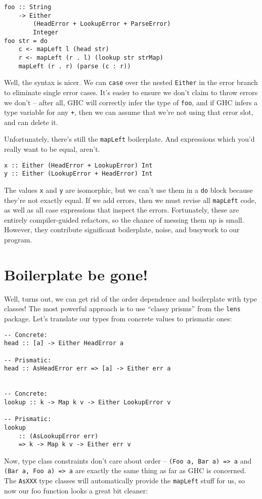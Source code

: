\begin{verbatim}
foo :: String
    -> Either
        (HeadError + LookupError + ParseError)
        Integer
foo str = do
    c <- mapLeft l (head str)
    r <- mapLeft (r . l) (lookup str strMap)
    mapLeft (r . r) (parse (c : r))
\end{verbatim}
Well, the syntax is nicer. We can \texttt{case} over the nested \texttt{Either} in the error branch to eliminate single error cases. It's easier to ensure we don't claim to throw errors we don't -- after all, GHC will correctly infer the type of \texttt{foo}, and if GHC infers a type variable for any \texttt{+}, then we can assume that we're not using that error slot, and can delete it.

Unfortunately, there's still the \texttt{mapLeft} boilerplate. And expressions which you'd really want to be equal, aren't.

\begin{verbatim}
x :: Either (HeadError + LookupError) Int
y :: Either (LookupError + HeadError) Int
\end{verbatim}
The values \texttt{x} and \texttt{y} are isomorphic, but we can't use them in a \texttt{do} block because they're not exactly equal. If we add errors, then we must revise all \texttt{mapLeft} code, as well as all case expressions that inspect the errors. Fortunately, these are entirely compiler-guided refactors, so the chance of messing them up is small. However, they contribute significant boilerplate, noise, and busywork to our program.

\section{Boilerplate be gone!}

Well, turns out, we can get rid of the order dependence and boilerplate with type classes! The most powerful approach is to use ``classy prisms'' from the \texttt{lens} package. Let's translate our types from concrete values to prismatic ones:

\begin{verbatim}
-- Concrete:
head :: [a] -> Either HeadError a

-- Prismatic:
head :: AsHeadError err => [a] -> Either err a


-- Concrete:
lookup :: k -> Map k v -> Either LookupError v

-- Prismatic:
lookup
    :: (AsLookupError err)
    => k -> Map k v -> Either err v
\end{verbatim}
Now, type class constraints don't care about order -- \texttt{(Foo a, Bar a) => a} and \texttt{(Bar a, Foo a) => a} are exactly the same thing as far as GHC is concerned. The \texttt{AsXXX} type classes will automatically provide the \texttt{mapLeft} stuff for us, so now our foo function looks a great bit cleaner:


